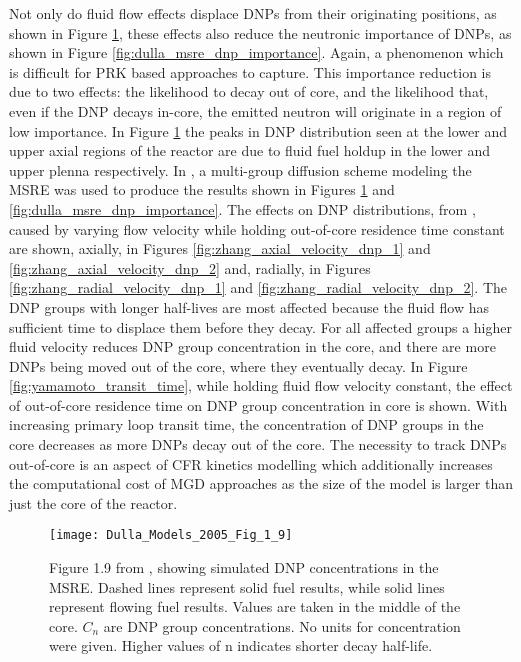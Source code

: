 \documentclass[review]{elsarticle}
\begin{document}
\par Not only do fluid flow effects displace DNPs from their originating positions,
as shown in Figure \ref{fig:dulla_msre_dnp_displacement}, these effects also
reduce the neutronic importance of DNPs, as shown in Figure
\ref{fig:dulla_msre_dnp_importance}. Again, a phenomenon which is difficult
for PRK based approaches to capture. This importance reduction is due to two
effects: the likelihood to decay out of core, and the likelihood that, even if the
DNP decays in-core, the emitted neutron will originate in a region of low
importance. In Figure \ref{fig:dulla_msre_dnp_displacement} the peaks in DNP
distribution seen at the lower and upper axial regions of the reactor are
due to fluid fuel holdup in the lower and upper plenna respectively.
In \cite{dulla_models_2005}, a multi-group
diffusion scheme modeling the MSRE was used to produce the results shown
in Figures
\ref{fig:dulla_msre_dnp_displacement} and \ref{fig:dulla_msre_dnp_importance}.
The effects on DNP distributions, from \cite{zhang_development_2009-1}, caused
by varying flow velocity while holding out-of-core residence time constant are
shown, axially, in Figures \ref{fig:zhang_axial_velocity_dnp_1} and 
\ref{fig:zhang_axial_velocity_dnp_2} and, radially, in Figures
\ref{fig:zhang_radial_velocity_dnp_1} and \ref{fig:zhang_radial_velocity_dnp_2}.
The DNP groups with longer half-lives are most affected because the
fluid flow has sufficient time to displace them before they decay. For all
affected groups a higher fluid velocity reduces DNP group
concentration in the core, and there are more DNPs being moved out of the
 core, where they
eventually decay. In Figure \ref{fig:yamamoto_transit_time},
 while holding fluid flow velocity constant, the effect of
out-of-core residence time on DNP group concentration
in core is shown. With increasing primary loop transit time,
the concentration
of DNP groups in the core decreases as more DNPs decay out of the core.
The necessity to track DNPs out-of-core is an aspect of CFR kinetics
modelling which additionally increases the computational cost of
MGD approaches as the size of the model is larger than just the
core of the reactor.

\begin{figure}[H]
   \centering
   \texttt{[image: Dulla\_Models\_2005\_Fig\_1\_9]}
   \caption{Figure 1.9 from \cite{dulla_models_2005}, 
    showing simulated DNP concentrations in the
    MSRE. Dashed lines represent
    solid fuel results, while solid lines represent flowing fuel results. Values
    are taken in the middle of the core. $C_{n}$ are DNP group concentrations. No
    units for concentration were given. Higher values of n indicates shorter
    decay half-life.}
   \label{fig:dulla_msre_dnp_displacement}
\end{figure}
\end{document}
